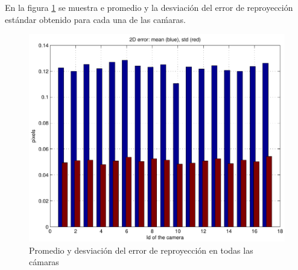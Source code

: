 En la figura \ref{fig: error reproyección} se muestra e promedio y la desviación del error de reproyección estándar obtenido para cada una de las caḿaras.

\begin{figure}[ht]
\begin{center}
\includegraphics[scale=0.4]{img/calibracion/reprerrors.pdf}
\end{center}
\caption{Promedio y desviación  del error de reproyección en todas las cámaras }
\label{fig: error reproyección}
\end{figure}
  





